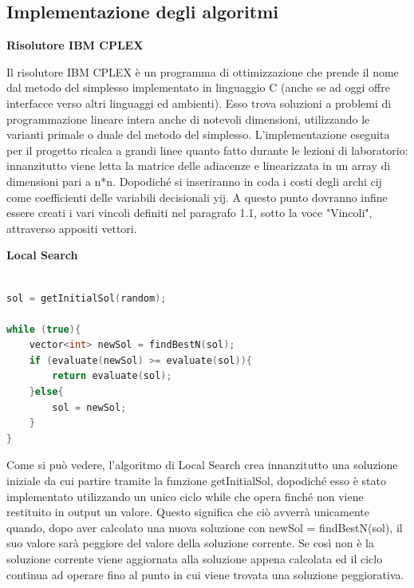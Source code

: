 \documentclass[preprint,12pt]{elsarticle}
\begin{document}
\subsection{\textbf{Implementazione degli algoritmi}\\}

\begin{large}
\textbf{Risolutore IBM CPLEX}
\end{large}


Il risolutore IBM CPLEX è un programma di ottimizzazione che prende il nome dal metodo del simplesso implementato in linguaggio C (anche se ad oggi offre interfacce verso altri linguaggi ed ambienti). Esso trova soluzioni a problemi di programmazione lineare intera anche di notevoli dimensioni, utilizzando le varianti primale o duale del metodo del simplesso. L'implementazione eseguita per il progetto ricalca a grandi linee quanto fatto durante le lezioni di laboratorio: innanzitutto viene letta la matrice delle adiacenze e linearizzata in un array di dimensioni pari a n*n. Dopodiché si inseriranno in coda i costi degli archi c{\tiny ij} come coefficienti delle variabili decisionali y{\tiny ij}. A questo punto dovranno infine essere creati i vari vincoli definiti nel paragrafo 1.1, sotto la voce "Vincoli", attraverso appositi vettori. \\



\begin{large}
\textbf{Local Search}
\end{large}

\begin{lstlisting}[basicstyle=\small, caption={Local Search}, frame=single, language=C++]

sol = getInitialSol(random);

while (true){
	vector<int> newSol = findBestN(sol);
	if (evaluate(newSol) >= evaluate(sol)){	
		return evaluate(sol);
	}else{					
		sol = newSol;
	}
}


\end{lstlisting}


Come si può vedere, l'algoritmo di Local Search crea innanzitutto una soluzione iniziale da cui partire tramite la funzione getInitialSol, dopodiché esso è stato implementato utilizzando un unico ciclo while che opera finché non viene restituito in output un valore. Questo significa che ciò avverrà unicamente quando, dopo aver calcolato una nuova soluzione con newSol = findBestN(sol), il suo valore sarà peggiore del valore della soluzione corrente. Se così non è la soluzione corrente viene aggiornata alla soluzione appena calcolata ed il ciclo continua ad operare fino al punto in cui viene trovata una soluzione peggiorativa. \\
\end{document}
